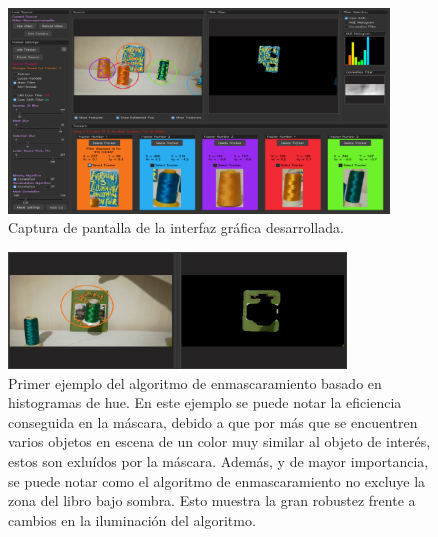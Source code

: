 \begin{figure}
	\centering
	\includegraphics[width=0.9\textwidth]{Imagenes/gui.png}
	\caption{Captura de pantalla de la interfaz gráfica desarrollada.}
	\label{gui}
\end{figure}

\begin{figure}
\centering
	\includegraphics[width=0.8\textwidth]{Imagenes/camshift_mask1.png}
	\caption{Primer ejemplo del algoritmo de enmascaramiento basado en histogramas de hue. En este ejemplo se puede notar la eficiencia conseguida en la máscara, debido a que por más que se encuentren varios objetos en escena de un color muy similar al objeto de interés, estos son exluídos por la máscara. Además, y de mayor importancia, se puede notar como el algoritmo de enmascaramiento no excluye la zona del libro bajo sombra. Esto muestra la gran robustez frente a cambios en la iluminación del algoritmo.}
	\label{fig:c_mask1}
\end{figure}

